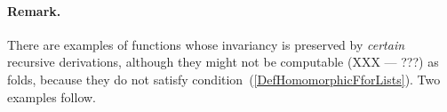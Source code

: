 \documentclass[11pt]{article} %
\newcommand{\eqn}[1]{(\ref{#1})}
\begin{document}



\paragraph{Remark.}
There are examples of functions whose invariancy is preserved by {\em certain} recursive derivations,
although they might not be computable (XXX --- ???) as folds, because they do not satisfy
condition~\eqn{DefHomomorphicFforLists}.
Two examples follow.
\end{document}
